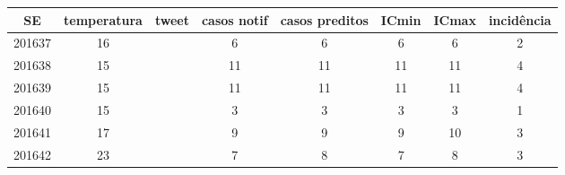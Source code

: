 \begin{tabular}{c|ccccccc}
  \hline
SE & temperatura & tweet & casos notif & casos preditos & ICmin & ICmax & incidência \\ 
  \hline
201637 & 16 &  & 6 & 6 & 6 & 6 & 2 \\ 
  201638 & 15 &  & 11 & 11 & 11 & 11 & 4 \\ 
  201639 & 15 &  & 11 & 11 & 11 & 11 & 4 \\ 
  201640 & 15 &  & 3 & 3 & 3 & 3 & 1 \\ 
  201641 & 17 &  & 9 & 9 & 9 & 10 & 3 \\ 
  201642 & 23 &  & 7 & 8 & 7 & 8 & 3 \\ 
   \hline
\end{tabular}
